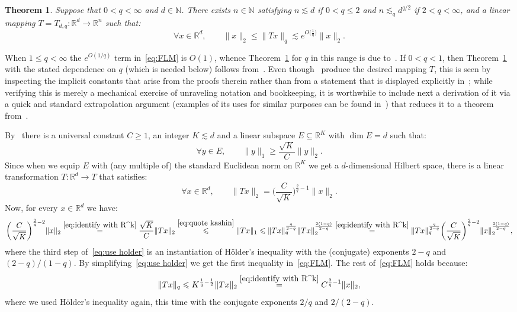 \documentclass[11pt,reqno]{amsart}
\newtheorem{theorem}{Theorem}
\newcommand{\R}{\mathbb{R}}
\newcommand{\N}{\mathbb{N}}
\renewcommand{\le}{\leqslant}
\renewcommand{\ge}{\geqslant}
\renewcommand{\subset}{\subseteq}
\newcommand{\1}{\mathbf{1}}
\begin{document}
\begin{theorem}\label{thm:FLM}  Suppose that   $0<q<\infty$ and $d\in \N$. There exists $n\in \N$ satisfying $n\lesssim d$ if $0<q\le 2$ and $n\lesssim_q d^{q/2}$ if $2<q<\infty$, and a linear mapping $T=T_{d,q}:\R^d\to \R^n$ such that:
\begin{equation}\label{eq:FLM}
\forall x\in \R^d,\qquad \|x\|_2\le \|Tx\|_q\lesssim e^{O\big(\frac{1}{q}\big)}\|x\|_2.
\end{equation}
\end{theorem}
When $1\le q <\infty$ the $e^{O(1/q)}$ term in~\eqref{eq:FLM} is $O(1)$, whence  Theorem~\ref{thm:FLM}   for $q$ in this range is due to~\cite{FLM}. If $0<q<1$,  then Theorem~\ref{thm:FLM} with the stated dependence on $q$ (which is needed below) follows from~\cite{Vyb08,FPRU10}. Even though~\cite{Vyb08,FPRU10} produce the desired mapping $T$, this is seen by inspecting the implicit constants that arise from the proofs therein rather than from a statement that is displayed explicitly in~\cite{Vyb08,FPRU10};  while verifying this is merely a mechanical exercise of unraveling notation and bookkeeping, it is worthwhile to include  next a derivation of it via a quick and standard extrapolation argument (examples of its uses for similar purposes can be found in~\cite{JS82,SZ01}) that reduces it to a theorem from~\cite{FLM,Kas77}. 




By~\cite{FLM,Kas77} there is a universal constant $C\ge 1$, an integer $K\lesssim d$  and a linear subspace $E\subset\mathbb R^K$ with $\dim E = d$ such that:
\begin{equation}\label{eq:quote kashin} 
\forall y\in E,\qquad  \|y\|_1 \ge \frac{\sqrt{K}}{C}\|y\|_2.
\end{equation}
Since when we equip  $E$ with (any multiple of) the standard Euclidean norm on $\R^K$ we get a $d$-dimensional Hilbert space, there is a linear transformation $T:\R^d\to T$ that satisfies:
\begin{equation}\label{eq:identify with R^k}
\forall x\in \R^d,\qquad \|Tx\|_2=\bigg(\frac{C}{\sqrt{K}}\bigg)^{\frac{2}{q}-1}\|x\|_2.
\end{equation} 
Now, for every $x\in \R^d$ we have:
\begin{equation}\label{eq:use holder}
\bigg(\frac{C}{\sqrt{K}}\bigg)^{\frac{2}{q}-2}\|x\|_2\stackrel{\eqref{eq:identify with R^k}}{=}\frac{\sqrt{K}}{C}\|Tx\|_2\stackrel{\eqref{eq:quote kashin} }{\le}\|Tx\|_1\le \|Tx\|_q^{\frac{q}{2-q}}\|Tx\|_2^{\frac{2(1-q)}{2-q}}\stackrel{\eqref{eq:identify with R^k}}{=}\|Tx\|_q^{\frac{q}{2-q}} \bigg(\frac{C}{\sqrt{K}}\bigg)^{\frac{2}{q}-2}\|x\|_2^{\frac{2(1-q)}{2-q}} ,
\end{equation}
where the third step of~\eqref{eq:use holder} is an instantiation of H\"older's inequality with the (conjugate) exponents $2-q$ and $(2-q)/(1-q)$. By simplifying~\eqref{eq:use holder} we get the first inequality in~\eqref{eq:FLM}. The rest of~\eqref{eq:FLM} holds because:
$$
\|Tx\|_q\le K^{\frac{1}{q}-\frac12}\|Tx\|_2\stackrel{\eqref{eq:identify with R^k}}{=}C^{\frac{2}{q}-1}\|x\|_2,
$$
where we used  H\"older's inequality again, this time  with the conjugate exponents $2/q$ and $2/(2-q)$.
\end{document}
